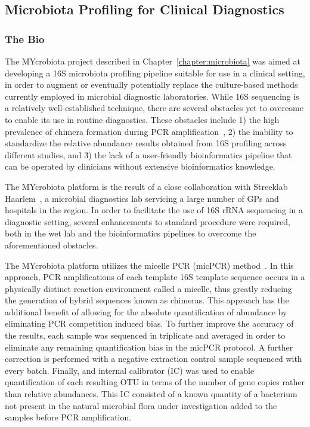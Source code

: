 \subsection{Microbiota Profiling for Clinical Diagnostics}
\subsubsection{The Bio}
The MYcrobiota project described in Chapter~\ref{chapter:microbiota} was aimed at developing a 16S microbiota profiling pipeline suitable for use in a clinical setting, in order to augment or eventually potentially replace the culture-based methods currently employed in microbial diagnostic laboratories. While 16S sequencing is a relatively well-established technique, there are several obstacles yet to overcome to enable its use in routine diagnostics. These obstacles include 1) the high prevalence of chimera formation during PCR amplification~\cite{huttenhower2012structure}, 2) the inability to standardize the relative abundance results obtained from 16S profiling across different studies, and 3) the lack of a user-friendly bioinformatics pipeline that can be operated by clinicians without extensive bioinformatics knowledge.

The MYcrobiota platform is the result of a close collaboration with Streeklab Haarlem~\cite{url-streeklab}, a microbial diagnostics lab servicing a large number of GPs and hospitals in the region. In order to facilitate the use of 16S rRNA sequencing in a diagnostic setting, several enhancements to standard procedure were required, both in the wet lab and the bioinformatics pipelines to overcome the aforementioned obstacles.

The MYcrobiota platform utilizes the micelle PCR (micPCR) method~\cite{boers2015micelle,boers2017novel}. In this approach, PCR amplifications of each template 16S template sequence occurs in a physically distinct reaction environment called a micelle, thus greatly reducing the generation of hybrid sequences known as chimeras. This approach has the additional benefit of allowing for the absolute quantification of abundance by eliminating PCR competition induced bias. To further improve the accuracy of the results, each sample was sequenced in triplicate and averaged in order to eliminate any remaining quantification bias in the micPCR protocol. A further correction is performed with a negative extraction control sample sequenced with every batch. Finally, and internal calibrator (IC) was used to enable quantification of each resulting OTU in terms of the number of gene copies rather than relative abundances. This IC consisted of a known quantity of a bacterium not present in the natural microbial flora under investigation added to the samples before PCR amplification.

